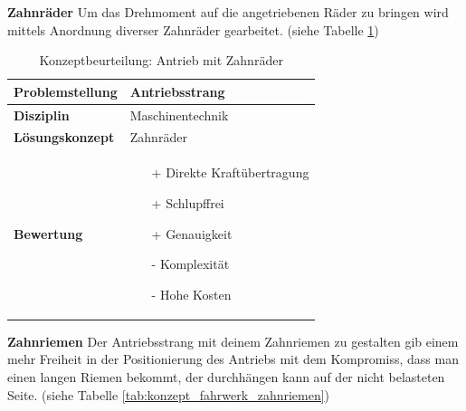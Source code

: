 \documentclass[../../main.tex]{subfiles}
\begin{document}
\textbf{Zahnräder}
Um das Drehmoment auf die angetriebenen Räder zu bringen wird mittels Anordnung diverser Zahnräder gearbeitet. (siehe Tabelle \ref{tab:konzept_fahrwerk_zahnraeder})

\begin{flushleft}
    \begin{table}[h]
    \begin{tabular}{ | l | p{11cm} |}
    \hline
    \textbf{Problemstellung} & Antriebsstrang \\ \hline
    \textbf{Disziplin} & Maschinentechnik \\ \hline
    \textbf{Lösungskonzept} & Zahnräder \\ \hline
    \textbf{Bewertung} &  \begin{itemize}
                            \item[+] Direkte Kraftübertragung
                            \item[+] Schlupffrei
                            \item[+] Genauigkeit
                            \item[-] Komplexität
                            \item[-] Hohe Kosten
                          \end{itemize} \\ \hline
    \end{tabular}
    \caption{Konzeptbeurteilung: Antrieb mit Zahnräder}
    \label{tab:konzept_fahrwerk_zahnraeder}
\end{table}
\end{flushleft}

\textbf{Zahnriemen}
Der Antriebsstrang mit deinem Zahnriemen zu gestalten gib einem mehr Freiheit in der Positionierung des Antriebs mit dem Kompromiss, dass man einen langen Riemen bekommt, der durchhängen kann auf der nicht belasteten Seite. (siehe Tabelle \ref{tab:konzept_fahrwerk_zahnriemen})
\end{document}
